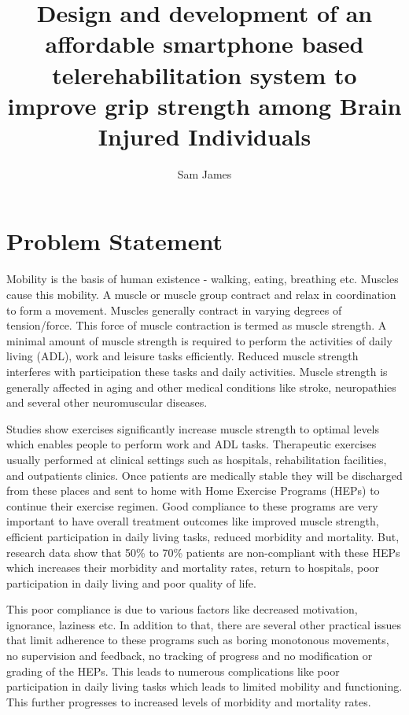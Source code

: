 \documentclass[12pt]{article}
\title{Design and development of an affordable smartphone based telerehabilitation system to improve grip strength among Brain Injured Individuals}
\author{Sam James}
\begin{document}
\maketitle
\section {Problem Statement}

Mobility is the basis of human existence - walking, eating, breathing etc. Muscles cause this mobility. A muscle or muscle group  contract and relax in coordination to form a movement. Muscles generally contract in varying degrees of tension/force. This force of muscle contraction is termed as muscle strength.  A minimal amount of muscle strength is required to perform the activities of daily living (ADL), work and leisure tasks efficiently. Reduced muscle strength interferes with participation these tasks  and daily activities.  Muscle strength is generally affected in aging and other medical conditions like stroke, neuropathies and several other neuromuscular diseases. 
\medskip

Studies show exercises significantly increase muscle strength to optimal levels which enables people to perform work and ADL tasks. Therapeutic exercises usually performed at clinical settings such as hospitals, rehabilitation facilities, and outpatients clinics. Once patients are medically stable they will be discharged from these places and sent to home with Home Exercise Programs (HEPs) to continue their exercise regimen. Good compliance to these programs are very important to have overall treatment outcomes like improved muscle strength, efficient participation in daily living tasks, reduced morbidity and  mortality. But, research data show that 50\% to 70\% patients are non-compliant with these HEPs \cite{bgwag13} which increases their morbidity and mortality rates, return to hospitals, poor participation in daily living and poor quality of life. 
\medskip

This poor compliance is due to various factors like decreased motivation, ignorance, laziness etc.  In addition to that, there are several other practical issues that limit adherence to these programs such as boring monotonous movements, no supervision and feedback, no tracking of progress and  no modification or grading of the HEPs. This leads to numerous complications like poor participation in daily living tasks which leads to limited mobility and functioning. This further progresses to increased levels of morbidity and mortality rates.
\end{document}
